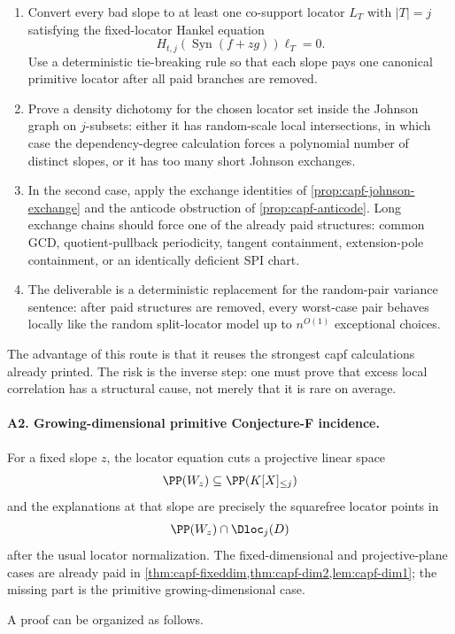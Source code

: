 \documentclass[11pt]{article}
\theoremstyle{definition}
\theoremstyle{remark}
\newcommand{\Syn}{\operatorname{Syn}}
\begin{document}
\begin{enumerate}[label=\textup{A1.\arabic*},leftmargin=3.0em]
\item Convert every bad slope to at least one co-support locator $L_T$ with $|T|=j$ satisfying the fixed-locator Hankel equation
\[
        H_{t,j}(\Syn(f+zg))\boldsymbol\ell_T=0 .
\]
Use a deterministic tie-breaking rule so that each slope pays one canonical primitive locator after all paid branches are removed.
\item Prove a density dichotomy for the chosen locator set inside the Johnson graph on $j$-subsets: either it has random-scale local intersections, in which case the dependency-degree calculation forces a polynomial number of distinct slopes, or it has too many short Johnson exchanges.
\item In the second case, apply the exchange identities of \cref{prop:capf-johnson-exchange} and the anticode obstruction of \cref{prop:capf-anticode}.  Long exchange chains should force one of the already paid structures: common GCD, quotient-pullback periodicity, tangent containment, extension-pole containment, or an identically deficient SPI chart.
\item The deliverable is a deterministic replacement for the random-pair variance sentence: after paid structures are removed, every worst-case pair behaves locally like the random split-locator model up to $n^{O(1)}$ exceptional choices.
\end{enumerate}

The advantage of this route is that it reuses the strongest capf calculations already printed.  The risk is the inverse step: one must prove that excess local correlation has a structural cause, not merely that it is rare on average.

\paragraph{A2. Growing-dimensional primitive Conjecture-F incidence.}
For a fixed slope $z$, the locator equation cuts a projective linear space
\[
        \PP(W_z)\subseteq \PP(K[X]_{\le j})
\]
and the explanations at that slope are precisely the squarefree locator points in
\[
        \PP(W_z)\cap \Dloc_j(D)
\]
after the usual locator normalization.  The fixed-dimensional and projective-plane cases are already paid in \cref{thm:capf-fixeddim,thm:capf-dim2,lem:capf-dim1}; the missing part is the primitive growing-dimensional case.

A proof can be organized as follows.
\end{document}
